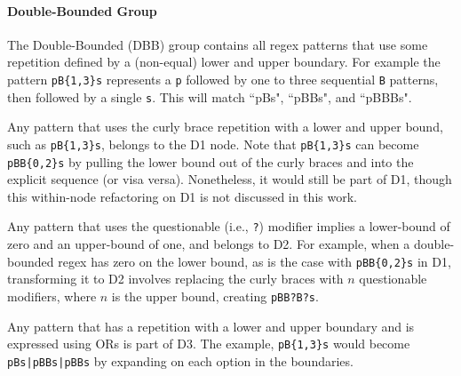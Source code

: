 \paragraph{Double-Bounded Group}
The Double-Bounded (DBB) group contains all regex patterns that use some repetition defined by a (non-equal) lower and upper boundary.  For example the pattern \verb!pB{1,3}s! represents a \verb!p! followed by one to three sequential \verb!B! patterns, then followed by a single \verb!s!.  This will match ``pBs", ``pBBs", and ``pBBBs".

\begin{description}  \itemsep -1pt
\item[D1:] Any pattern that  uses the curly brace repetition with a lower and upper bound, such as  \verb!pB{1,3}s!, belongs to the D1 node.
Note that  \verb!pB{1,3}s! can become \verb!pBB{0,2}s! by pulling the lower bound out of the curly braces and into the explicit sequence (or visa versa). Nonetheless, it would still be part of D1, though this within-node refactoring on D1 is not discussed in this work.
\item[D2:] Any pattern that uses the questionable (i.e., \verb!?!) modifier implies a lower-bound of zero and an upper-bound of one, and belongs to D2. For example, when a double-bounded regex has zero on the lower bound, as is the case with \verb!pBB{0,2}s!  in D1, transforming it to D2 involves replacing the curly braces with $n$ questionable modifiers, where $n$ is the upper bound,  creating \verb!pBB?B?s!.
\item[D3:] Any pattern that has a repetition with a lower and upper boundary and is expressed using ORs is part of D3.  The example, \verb!pB{1,3}s! would become \verb!pBs|pBBs|pBBs! by expanding on each option in the boundaries.

\end{description}
